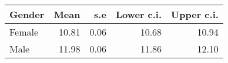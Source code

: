 \begin{tabular}{lrrrr}
  \hline
Gender & Mean & s.e & Lower c.i. & Upper c.i. \\ 
  \hline
Female & 10.81 & 0.06 & 10.68 & 10.94 \\ 
  Male & 11.98 & 0.06 & 11.86 & 12.10 \\ 
   \hline
\end{tabular}
